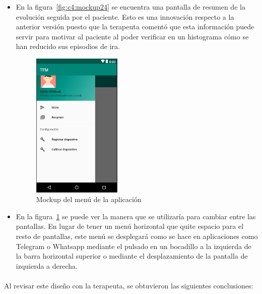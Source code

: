 \begin{itemize}

    \item En la figura~\ref{fig:c4:mockup24} se encuentra una pantalla de resumen de la evolución seguida por el paciente. Esto es una innovación respecto a la anterior versión puesto que la terapeuta comentó que esta información puede servir para motivar al paciente al poder verificar en un histograma cómo se han reducido sus episodios de ira.

\begin{figure}[h!]
    \centering
    \begin{minipage}{.45\textwidth}
        \centering
        \includegraphics[width=0.8\linewidth, height=7cm]{Imagenes/anxA16.png}
        \caption[Mockup del menú de la aplicación]{Mockup del menú de la aplicación}
        \label{fig:c4:mockup25}
    \end{minipage}
\end{figure}

    \item En la figura~\ref{fig:c4:mockup25} se puede ver la manera que se utilizaría para cambiar entre las pantallas. En lugar de tener un menú horizontal que quite espacio para el resto de pantallas, este menú se desplegará como se hace en aplicaciones como Telegram o Whatsapp mediante el pulsado en un bocadillo a la izquierda de la barra horizontal superior o mediante el desplazamiento de la pantalla de izquierda a derecha.
\end{itemize}

\paragraph{}
Al revisar este diseño con la terapeuta, se obtuvieron las siguientes conclusiones:

